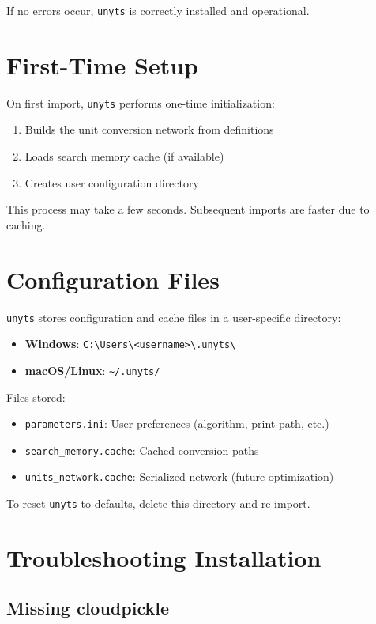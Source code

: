 \documentclass[11pt,a4paper]{report}
\begin{document}
If no errors occur, \texttt{unyts} is correctly installed and operational.

\section{First-Time Setup}

On first import, \texttt{unyts} performs one-time initialization:
\begin{enumerate}[leftmargin=*]
  \item Builds the unit conversion network from definitions
  \item Loads search memory cache (if available)
  \item Creates user configuration directory
\end{enumerate}

This process may take a few seconds. Subsequent imports are faster due to caching.

\section{Configuration Files}

\texttt{unyts} stores configuration and cache files in a user-specific directory:
\begin{itemize}[leftmargin=*]
  \item \textbf{Windows}: \texttt{C:\textbackslash Users\textbackslash<username>\textbackslash .unyts\textbackslash}
  \item \textbf{macOS/Linux}: \texttt{\textasciitilde/.unyts/}
\end{itemize}

Files stored:
\begin{itemize}[leftmargin=*]
  \item \texttt{parameters.ini}: User preferences (algorithm, print path, etc.)
  \item \texttt{search\_memory.cache}: Cached conversion paths
  \item \texttt{units\_network.cache}: Serialized network (future optimization)
\end{itemize}

To reset \texttt{unyts} to defaults, delete this directory and re-import.

\section{Troubleshooting Installation}

\subsection{Missing cloudpickle}
\end{document}
